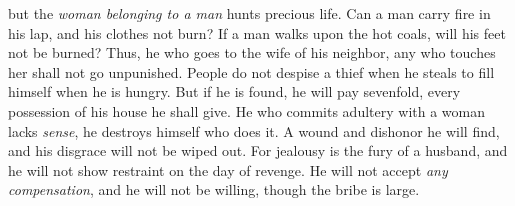 \begin{biblechapter}
but the \textit{woman belonging to a man} hunts precious life.
 Can a man carry fire in his lap, 
and his clothes not burn?
\verse If a man walks upon the hot coals, 
will his feet not be burned?
\verse Thus, he who goes to the wife of his neighbor, 
any who touches her shall not go unpunished.
\verse People do not despise a thief when he steals 
to fill himself when he is hungry.
\verse But if he is found, he will pay sevenfold, 
every possession of his house he shall give.
\verse He who commits adultery with a woman lacks \textit{sense}, 
he destroys himself who does it.
\verse A wound and dishonor he will find, 
and his disgrace will not be wiped out.
\verse For jealousy is the fury of a husband, 
and he will not show restraint on the day of revenge.
\verse He will not accept \textit{any compensation}, 
and he will not be willing, though the bribe is large.
\end{biblechapter}

